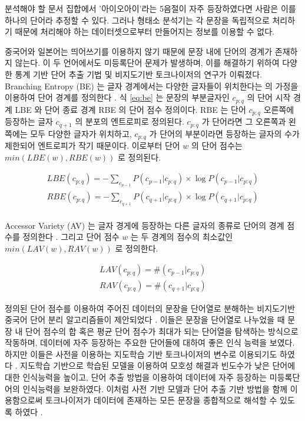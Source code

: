 \documentclass[oneside, ko,phd]{snuthesis_utf8_kor}
\begin{document}
분석해야 할 문서 집합에서 '아이오아이'라는 5음절이 자주 등장하였다면 사람은 이를 하나의 단어라 추정할 수 있다.
그러나 형태소 분석기는 각 문장을 독립적으로 처리하기 때문에 처리해야 하는 데이터셋으로부터 만들어지는 정보를 이용할 수 없다.

중국어와 일본어는 띄어쓰기를 이용하지 않기 때문에 문장 내에 단어의 경계가 존재하지 않는다.
이 두 언어에서도 미등록단어 문제가 발생하며, 이를 해결하기 위하여 다양한 통계 기반 단어 추출 기법 및 비지도기반 토크나이저의 연구가 이뤄졌다.
Branching Entropy (BE) 는 글자 경계에서는 다양한 글자들이 위치한다는 \cite{harris1954distributional} 의 가정을 이용하여 단어 경계를 정의한다 \cite{jin2006unsupervised}.
식 \ref{eq:be} 는 문장의 부분글자인 $c_{p:q}$ 의 단어 시작 경계 LBE 와 단어 종료 경계 RBE 의 단어 점수 정의이다.
RBE 는 단어 $c_{p:q}$ 오른쪽에 등장하는 글자 $c_{q+1}$ 의 분포의 엔트로피로 정의된다.
$c_{p:q}$ 가 단어라면 그 오른쪽과 왼쪽에는 모두 다양한 글자가 위치하고, $c_{p:q}$ 가 단어의 부분이라면 등장하는 글자의 수가 제한되어 엔트로피가 작기 때문이다.
이로부터 단어 $w$ 의 단어 점수는 $min(LBE(w), RBE(w))$ 로 정의된다.

\begin{equation}
\label{eq:be}
\begin{aligned}
LBE(c_{p:q}) = - \sum_{c_{p-1}} P(c_{p-1} \vert c_{p:q}) \times \log P(c_{p-1} \vert c_{p:q}) \\
RBE(c_{p:q}) = - \sum_{c_{q+1}} P(c_{q+1} \vert c_{p:q}) \times \log P(c_{q+1} \vert c_{p:q}) \\
\end{aligned}
\end{equation}

Accessor Variety (AV) 는 글자 경게에 등장하는 다른 글자의 종류로 단어의 경계 점수를 정의한다 \cite{feng2004accessor}.
그리고 단어 점수 $w$ 는 두 경계의 점수의 최소값인 $min(LAV(w), RAV(w))$ 로 정의한다.

\begin{equation}
\label{eq:av}
\begin{aligned}
LAV(c_{p:q}) = \# (c_{p-1} \vert c_{p:q}) \\
RAV(c_{p:q}) = \# (c_{q+1} \vert c_{p:q}) 
\end{aligned}
\end{equation}

정의된 단어 점수를 이용하여 주어진 데이터의 문장을 단어열로 분해하는 비지도기반 중국어 단어 분리 알고리즘들이 제안되었다 \cite{zhao2008exploiting, feng2004unsupervised}.
이들은 문장을 단어열로 나누었을 때 문장 내 단어 점수의 합 혹은 평균 단어 점수가 최대가 되는 단어열을 탐색하는 방식으로 작동하며, 데이터에 자주 등장하는 주요한 단어들에 대하여 좋은 인식 능력을 보였다.
하지만 이들은 사전을 이용하는 지도학습 기반 토크나이저의 변수로 이용되기도 하였다 \cite{zhao2007incorporating, zhao2008unsupervised, zhao2011integrating, sun2011enhancing, zheng2013deep}.
지도학습 기반으로 학습된 모델을 이용하여 모호성 해결과 빈도수가 낮은 단어에 대한 인식능력을 높이고, 단어 추출 방법을 이용하여 데이터에 자주 등장하는 미등록단어의 인식능력을 보완하였다.
이처럼 사전 기반 모델과 단어 추출 기반 방법을 함께 이용함으로써 토크나이저가 데이터에 존재하는 모든 문장을 종합적으로 해석할 수 있도록 하였다 \cite{zhao2007incorporating}. 
\end{document}

